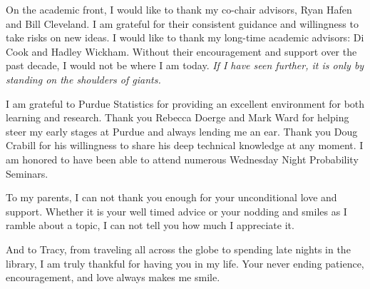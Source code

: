 \documentclass[stat,dissertation]{puthesis}\usepackage[]{graphicx}\usepackage{xcolor}
\begin{document}
\begin{acknowledgments}
  On the academic front, I would like to thank my co-chair advisors, Ryan Hafen and Bill Cleveland.  I am grateful for their consistent guidance and willingness to take risks on new ideas.  I would like to thank my long-time academic advisors: Di Cook and Hadley Wickham.  Without their encouragement and support over the past decade, I would not be where I am today.  \emph{If I have seen further, it is only by standing on the shoulders of giants.}

  I am grateful to Purdue Statistics for providing an excellent environment for both learning and research.  Thank you Rebecca Doerge and Mark Ward for helping steer my early stages at Purdue and always lending me an ear.  Thank you Doug Crabill for his willingness to share his deep technical knowledge at any moment.  I am honored to have been able to attend numerous Wednesday Night Probability Seminars.

  To my parents, I can not thank you enough for your unconditional love and support.  Whether it is your well timed advice or your nodding and smiles as I ramble about a topic, I can not tell you how much I appreciate it.

  And to Tracy, from traveling all across the globe to spending late nights in the library, I am truly thankful for having you in my life.  Your never ending patience, encouragement, and love always makes me smile.
\end{acknowledgments}


\tableofcontents
\end{document}
